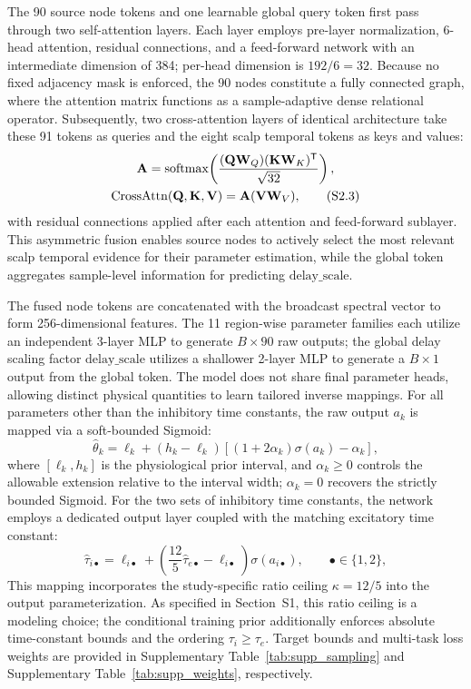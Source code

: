 \documentclass[11pt]{article}
\begin{document}
The 90 source node tokens and one learnable global query token first pass through two self-attention layers. Each layer employs pre-layer normalization, 6-head attention, residual connections, and a feed-forward network with an intermediate dimension of 384; per-head dimension is $192/6=32$. Because no fixed adjacency mask is enforced, the 90 nodes constitute a fully connected graph, where the attention matrix functions as a sample-adaptive dense relational operator. Subsequently, two cross-attention layers of identical architecture take these 91 tokens as queries and the eight scalp temporal tokens as keys and values:
\begin{gather}
    \mathbf{A} = \operatorname{softmax}\!\left(\frac{(\mathbf{Q}\mathbf{W}_{Q})(\mathbf{K}\mathbf{W}_{K})^{\mathsf T}}{\sqrt{32}}\right), \notag\\
    \operatorname{CrossAttn}(\mathbf{Q},\mathbf{K},\mathbf{V}) = \mathbf{A}(\mathbf{V}\mathbf{W}_{V}),
    \tag{S2.3}
\end{gather}
with residual connections applied after each attention and feed-forward sublayer. This asymmetric fusion enables source nodes to actively select the most relevant scalp temporal evidence for their parameter estimation, while the global token aggregates sample-level information for predicting $\mathrm{delay\_scale}$.

The fused node tokens are concatenated with the broadcast spectral vector to form 256-dimensional features. The 11 region-wise parameter families each utilize an independent 3-layer MLP to generate $B\times90$ raw outputs; the global delay scaling factor $\mathrm{delay\_scale}$ utilizes a shallower 2-layer MLP to generate a $B\times1$ output from the global token. The model does not share final parameter heads, allowing distinct physical quantities to learn tailored inverse mappings. For all parameters other than the inhibitory time constants, the raw output $a_k$ is mapped via a soft-bounded Sigmoid:
\begin{equation}
    \widehat{\theta}_k=\ell_k+(h_k-\ell_k)
    \left[(1+2\alpha_k)\sigma(a_k)-\alpha_k\right],
    \tag{S2.4}
\end{equation}
where $[\ell_k,h_k]$ is the physiological prior interval, and $\alpha_k\geq0$ controls the allowable extension relative to the interval width; $\alpha_k=0$ recovers the strictly bounded Sigmoid. For the two sets of inhibitory time constants, the network employs a dedicated output layer coupled with the matching excitatory time constant:
\begin{equation}
    \widehat{\tau}_{i\bullet}=\ell_{i\bullet}+
    \left(\frac{12}{5}\widehat{\tau}_{e\bullet}-\ell_{i\bullet}\right)
    \sigma(a_{i\bullet}),\qquad \bullet\in\{1,2\},
    \tag{S2.5}
\end{equation}
This mapping incorporates the study-specific ratio ceiling $\kappa=12/5$ into the output parameterization. As specified in Section~S1, this ratio ceiling is a modeling choice; the conditional training prior additionally enforces absolute time-constant bounds and the ordering $\tau_i\geq\tau_e$. Target bounds and multi-task loss weights are provided in Supplementary Table~\ref{tab:supp_sampling} and Supplementary Table~\ref{tab:supp_weights}, respectively.
\end{document}

